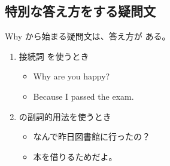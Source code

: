 \subsection{特別な答え方をする疑問文}
    Why から始まる疑問文は、答え方が  ある。

    \begin{enumerate}
        \item 接続詞 を使うとき
        \par\vspace{0.5em}
        \noindent
        \begin{minipage}[t]{0.48\linewidth}
            \begin{itemize}
                \item Why are you happy?
            \end{itemize}
        \end{minipage}\hfill
        \begin{minipage}[t]{0.48\linewidth}
            \begin{itemize}
                \item[\answermark] Because I passed the exam.
            \end{itemize}
        \end{minipage}
        \par\vspace{2em}
        \item {}の副詞的用法を使うとき
        \par\vspace{0.5em}
        \noindent
        \begin{minipage}[t]{0.48\linewidth}
            \begin{itemize}
                \item なんで昨日図書館に行ったの？
            \end{itemize}
        \end{minipage}\hfill
        \begin{minipage}[t]{0.48\linewidth}
            \begin{itemize}
                \item[\answermark] 本を借りるためだよ。
            \end{itemize}
        \end{minipage}
        \par\vspace{0.5em}
    \end{enumerate}
\vspace{2em}
